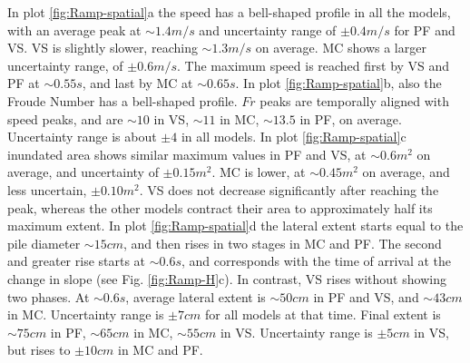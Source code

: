 \documentclass{article}
\begin{document}
In plot \ref{fig:Ramp-spatial}a the speed has a bell-shaped profile in all the models, with an average peak at $\sim 1.4 m/s$ and uncertainty range of $\pm 0.4 m/s$ for PF and VS. VS is slightly slower, reaching $\sim 1.3 m/s$ on average. MC shows a larger uncertainty range, of $\pm 0.6 m/s$. The maximum speed is reached first by VS and PF at $\sim 0.55 s$, and last by MC at $\sim 0.65 s$. In plot \ref{fig:Ramp-spatial}b, also the Froude Number has a bell-shaped profile. $Fr$ peaks are temporally aligned with speed peaks, and are $\sim 10$ in VS, $\sim 11$ in MC, $\sim 13.5$ in PF, on average. Uncertainty range is about $\pm 4$ in all models. In plot \ref{fig:Ramp-spatial}c inundated area shows similar maximum values in PF and VS, at $\sim 0.6 m^2$ on average, and uncertainty of $\pm 0.15 m^2$. MC is lower, at $\sim 0.45 m^2$ on average, and less uncertain, $\pm 0.10 m^2$. VS does not decrease significantly after reaching the peak, whereas the other models contract their area to approximately half its maximum extent. In plot \ref{fig:Ramp-spatial}d the lateral extent starts equal to the pile diameter $\sim 15 cm$, and then rises in two stages in MC and PF. The second and greater rise starts at $\sim 0.6 s$, and corresponds with the time of arrival at the change in slope (see Fig. \ref{fig:Ramp-H}c). In contrast, VS rises without showing two phases. At $\sim 0.6 s$, average lateral extent is $\sim 50 cm$ in PF and VS, and $\sim 43 cm$ in MC. Uncertainty range is $\pm 7 cm$ for all models at that time. Final extent is $\sim 75 cm$ in PF, $\sim 65 cm$ in MC, $\sim 55 cm$ in VS. Uncertainty range is $\pm 5 cm$ in VS, but rises to $\pm 10 cm$ in MC and PF.
\end{document}
